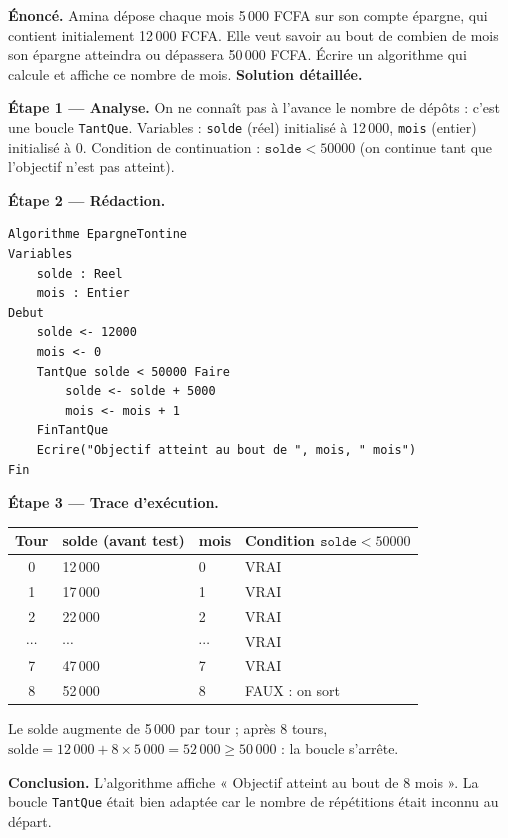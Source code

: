 \documentclass[11pt]{article}
\begin{document}
\begin{exoresolu}
\textbf{Énoncé.} Amina dépose chaque mois 5\,000 FCFA sur son compte épargne, qui contient initialement 12\,000 FCFA. Elle veut savoir au bout de combien de mois son épargne atteindra ou dépassera 50\,000 FCFA. Écrire un algorithme qui calcule et affiche ce nombre de mois.
\tcblower
\textbf{Solution détaillée.}

\textbf{Étape 1 — Analyse.} On ne connaît pas à l'avance le nombre de dépôts : c'est une boucle \texttt{TantQue}. Variables : \texttt{solde} (réel) initialisé à 12\,000, \texttt{mois} (entier) initialisé à 0. Condition de continuation : $\texttt{solde} < 50000$ (on continue tant que l'objectif n'est pas atteint).

\textbf{Étape 2 — Rédaction.}
\begin{lstlisting}
Algorithme EpargneTontine
Variables
    solde : Reel
    mois : Entier
Debut
    solde <- 12000
    mois <- 0
    TantQue solde < 50000 Faire
        solde <- solde + 5000
        mois <- mois + 1
    FinTantQue
    Ecrire("Objectif atteint au bout de ", mois, " mois")
Fin
\end{lstlisting}

\textbf{Étape 3 — Trace d'exécution.}
\begin{center}
\begin{tabularx}{\linewidth}{|c|X|X|l|}
\hline
\rowcolor{popblueL} Tour & solde (avant test) & mois & Condition $\texttt{solde}<50000$ \\
\hline
0 & 12\,000 & 0 & VRAI \\
\hline
1 & 17\,000 & 1 & VRAI \\
\hline
2 & 22\,000 & 2 & VRAI \\
\hline
$\cdots$ & $\cdots$ & $\cdots$ & VRAI \\
\hline
7 & 47\,000 & 7 & VRAI \\
\hline
8 & 52\,000 & 8 & FAUX : on sort \\
\hline
\end{tabularx}
\end{center}
Le solde augmente de 5\,000 par tour ; après 8 tours, $\text{solde} = 12\,000 + 8 \times 5\,000 = 52\,000 \geq 50\,000$ : la boucle s'arrête.

\textbf{Conclusion.} L'algorithme affiche « Objectif atteint au bout de 8 mois ». La boucle \texttt{TantQue} était bien adaptée car le nombre de répétitions était inconnu au départ.
\end{exoresolu}
\end{document}
